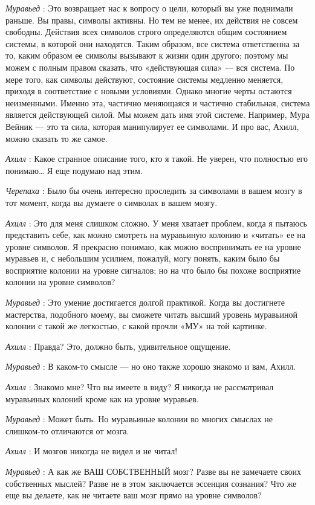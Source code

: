 \documentclass[../main.tex]{subfiles}
\begin{document}
\begin{dialogue}
\emph{Муравьед} : Это возвращает нас к вопросу о цели, который вы уже поднимали раньше. Вы правы, символы активны. Но тем не менее, их действия не совсем свободны. Действия всех символов строго определяются общим состоянием системы, в которой они находятся. Таким образом, все система ответственна за то, каким образом ее символы вызывают к жизни один другого; поэтому мы можем с полным правом сказать, что «действующая сила» --- вся система. По мере того, как символы действуют, состояние системы медленно меняется, приходя в соответствие с новыми условиями. Однако многие черты остаются неизменными. Именно эта, частично меняющаяся и частично стабильная, система является действующей силой. Мы можем дать имя этой системе. Например, Мура Вейник --- это та сила, которая манипулирует ее символами. И про вас, Ахилл, можно сказать то же самое.

\emph{Ахилл} : Какое странное описание того, кто я такой. Не уверен, что полностью его понимаю\ldots{} Я еще подумаю над этим.

\emph{Черепаха} : Было бы очень интересно проследить за символами в вашем мозгу в тот момент, когда вы думаете о символах в вашем мозгу.

\emph{Ахилл} : Это для меня слишком сложно. У меня хватает проблем, когда я пытаюсь представить себе, как можно смотреть на муравьиную колонию и «читать» ее на уровне символов. Я прекрасно понимаю, как можно воспринимать ее на уровне муравьев и, с небольшим усилием, пожалуй, могу понять, каким было бы восприятие колонии на уровне сигналов; но на что было бы похоже восприятие колонии на уровне символов?

\emph{Муравьед} : Это умение достигается долгой практикой. Когда вы достигнете мастерства, подобного моему, вы сможете читать высший уровень муравьиной колонии с такой же легкостью, с какой прочли «МУ» на той картинке.

\emph{Ахилл} : Правда? Это, должно быть, удивительное ощущение.

\emph{Муравьед} : В каком-то смысле --- но оно также хорошо знакомо и вам, Ахилл.

\emph{Ахилл} : Знакомо мне? Что вы имеете в виду? Я никогда не рассматривал муравьиных колоний кроме как на уровне муравьев.

\emph{Муравьед} : Может быть. Но муравьиные колонии во многих смыслах не слишком-то отличаются от мозга.

\emph{Ахилл} : И мозгов никогда не видел и не читал!

\emph{Муравьед} : А как же ВАШ СОБСТВЕННЫЙ мозг? Разве вы не замечаете своих собственных мыслей? Разве не в этом заключается эссенция сознания? Что же еще вы делаете, как не читаете ваш мозг прямо на уровне символов?


\end{dialogue}
\end{document}
